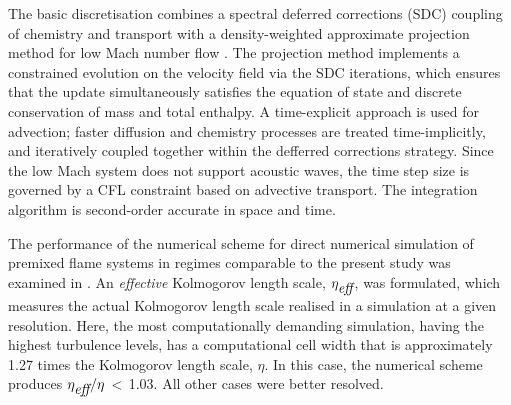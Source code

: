 The basic discretisation combines a spectral deferred corrections (SDC) coupling
of chemistry and transport \cite{LMC_SDC} with a density-weighted approximate
projection method for low Mach number flow \cite{DayBell:2000}.  The projection method
implements a constrained evolution on the velocity field via the SDC iterations,
which ensures that the update simultaneously satisfies the 
equation of state and discrete conservation of mass and total enthalpy.
A time-explicit approach is used for advection; faster diffusion
and chemistry processes are treated time-implicitly, and iteratively
coupled together within the defferred corrections strategy.
Since the low Mach system does not support acoustic waves,
the time step size is governed by a CFL constraint based on advective transport.
The integration algorithm is second-order accurate in space
and time.

The performance of the numerical scheme for direct numerical 
simulation of premixed flame systems in regimes comparable to the present study
was examined in \cite{Aspden08b}.  An {\em effective} Kolmogorov
length scale, $\eta_{\mbox{\it eff}}$, was formulated, which measures the actual Kolmogorov length
scale realised in a simulation at a given resolution.
Here, the most computationally demanding simulation, having the highest turbulence levels,
has a computational cell width that is approximately 1.27 times the
Kolmogorov length scale, $\eta$.  In this case, the numerical scheme produces
$\eta_{\mbox{\it eff}}/\eta\,$$<\,$1.03.  All other cases were better resolved.
